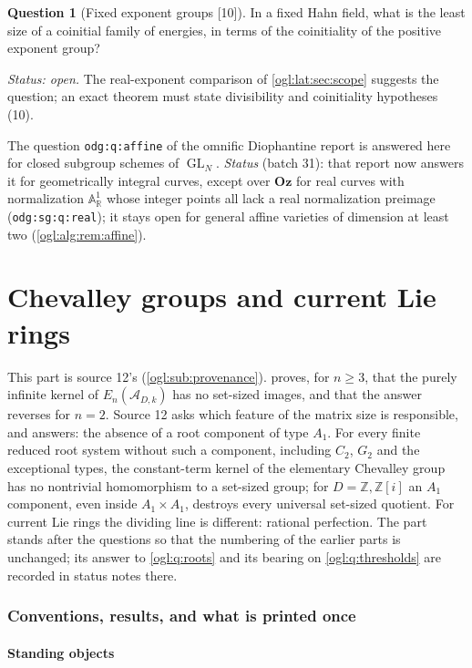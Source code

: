 \documentclass[11pt,oneside]{article}
\numberwithin{equation}{section}
\theoremstyle{definition}
\newtheorem{question}[question]{Question}
\theoremstyle{remark}
\newcommand{\Oz}{\mathbf{Oz}}
\newcommand{\Z}{\mathbb Z}
\newcommand{\R}{\mathbb R}
\newcommand{\A}{\mathcal A}
\newcommand{\GL}{\operatorname{GL}}
\newcommand{\src}[1]{\textup{\textsf{\small[#1]}}}
\newcommand{\replabel}[1]{\nolinkurl{#1}}
\begin{document}
\begin{question}[Fixed exponent groups \src{10}]\label{ogl:q:fixedgroups}
In a fixed Hahn field, what is the least size of a coinitial family of energies,
in terms of the coinitiality of the positive exponent group?
\end{question}
\emph{Status: open.} The real-exponent comparison of \cref{ogl:lat:sec:scope}
suggests the question; an exact theorem must state divisibility and coinitiality
hypotheses (10).

The question \replabel{odg:q:affine} of the omnific Diophantine report is
answered here for closed subgroup schemes of $\GL_N$. \emph{Status} (batch 31):
that report now answers it for geometrically integral curves, except over
$\Oz$ for real curves with normalization $\mathbb A^1_\R$ whose integer points
all lack a real normalization preimage (\replabel{odg:sg:q:real}); it stays
open for general affine varieties of dimension at least two
(\cref{ogl:alg:rem:affine}).

\part{Chevalley groups and current Lie rings}\label{ogl:ch:part}

This part is source 12's (\cref{ogl:sub:provenance}). 
proves, for $n\ge3$, that the purely infinite kernel of $E_n(\A_{D,k})$ has no
set-sized images, and that the answer reverses for $n=2$. Source 12 asks which
feature of the matrix size is responsible, and answers: the absence of a root
component of type $A_1$. For every finite reduced root system without such a
component, including $C_2$, $G_2$ and the exceptional types, the constant-term
kernel of the elementary Chevalley group has no nontrivial homomorphism to a
set-sized group; for $D=\Z,\Z[i]$ an $A_1$ component, even inside
$A_1\times A_1$, destroys every universal set-sized quotient. For current Lie
rings the dividing line is different: rational perfection. The part stands
after the questions so that the numbering of the earlier parts is unchanged;
its answer to \cref{ogl:q:roots} and its bearing on \cref{ogl:q:thresholds} are
recorded in status notes there.

\section{Conventions, results, and what is printed once}\label{ogl:ch:sec:conventions}

\subsection{Standing objects}\label{ogl:ch:sub:standing}
\end{document}
